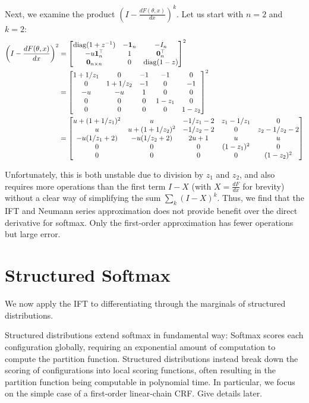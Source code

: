 \documentclass[11pt]{article}
\begin{document}
Next, we examine the product $(I-\frac{dF(\theta,x)}{dx})^k$.
Let us start with $n = 2$ and $k=2$:
\begin{align*}
\left(I-\frac{dF(\theta,x)}{dx}\right)^2
&= \begin{bmatrix}
    \mathrm{diag}(1+z^{-1}) & -\mathbf{1}_n & -I_n\\
    -u\mathbf{1}_n^\top & 1 & \mathbf{0}_n^\top\\
    \mathbf{0}_{n\times n} & 0 & \mathrm{diag}(1-z)
\end{bmatrix}^2\\
&= \begin{bmatrix}
    1 + 1/z_1 & 0 & -1 & -1 & 0\\
    0 & 1+1/z_2 & -1 & 0 & -1\\
    -u & -u & 1 & 0 & 0\\
    0 & 0 & 0 & 1-z_1 &0\\
    0 & 0 & 0 & 0 & 1-z_2
\end{bmatrix}^2\\
&= \begin{bmatrix}
    u + (1+1/z_1)^2 & u & -1/z_1 - 2 & z_1 - 1/z_1 & 0\\
    u & u+(1+1/z_2)^2 & -1/z_2 - 2 & 0 & z_2-1/z_2-2\\
    -u(1/z_1+2) & -u(1/z_2+2) & 2u+1 & u & u\\
    0 & 0 & 0 & (1-z_1)^2 &0\\
    0 & 0 & 0 & 0 & (1-z_2)^2
\end{bmatrix}
\end{align*}

Unfortunately, this is both unstable due to division by $z_1$ and $z_2$,
and also requires more operations than the first term $I-X$ (with $X=\frac{dF}{dx}$ for brevity)
without a clear way of simplifying the sum $\sum_k (I-X)^k$.
Thus, we find that the IFT and Neumann series approximation does not provide benefit over the direct
derivative for softmax.
Only the first-order approximation has fewer operations but large error.


\section{Structured Softmax}
We now apply the IFT to differentiating through the marginals of
structured distributions.

Structured distributions extend softmax in fundamental way:
Softmax scores each configuration globally, requiring an exponential amount of
computation to compute the partition function.
Structured distributions instead break down the scoring of configurations into local
scoring functions, often resulting in the partition function being computable in
polynomial time.
In particular, we focus on the simple case of a first-order linear-chain CRF.
{\color{red} Give details later.}
\end{document}
